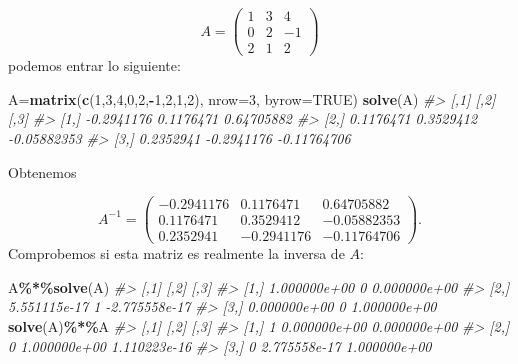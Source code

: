 \documentclass[
]{book}
\newenvironment{Shaded}{\begin{snugshade}}{\end{snugshade}}
\newcommand{\CommentTok}[1]{\textcolor[rgb]{0.56,0.35,0.01}{\textit{#1}}}
\newcommand{\DataTypeTok}[1]{\textcolor[rgb]{0.13,0.29,0.53}{#1}}
\newcommand{\DecValTok}[1]{\textcolor[rgb]{0.00,0.00,0.81}{#1}}
\newcommand{\KeywordTok}[1]{\textcolor[rgb]{0.13,0.29,0.53}{\textbf{#1}}}
\newcommand{\NormalTok}[1]{#1}
\newcommand{\OperatorTok}[1]{\textcolor[rgb]{0.81,0.36,0.00}{\textbf{#1}}}
\newcommand{\OtherTok}[1]{\textcolor[rgb]{0.56,0.35,0.01}{#1}}
\theoremstyle{definition}
\theoremstyle{definition}
\theoremstyle{definition}
\theoremstyle{remark}
\begin{document}
\[
A=\left(\begin{array}{ccc}
1 & 3 & 4 \\ 0 & 2 & -1 \\ 2 & 1 & 2\end{array}
\right)
\]
podemos entrar lo siguiente:

\begin{Shaded}
\begin{Highlighting}[]
\NormalTok{A=}\KeywordTok{matrix}\NormalTok{(}\KeywordTok{c}\NormalTok{(}\DecValTok{1}\NormalTok{,}\DecValTok{3}\NormalTok{,}\DecValTok{4}\NormalTok{,}\DecValTok{0}\NormalTok{,}\DecValTok{2}\NormalTok{,}\OperatorTok{{-}}\DecValTok{1}\NormalTok{,}\DecValTok{2}\NormalTok{,}\DecValTok{1}\NormalTok{,}\DecValTok{2}\NormalTok{), }\DataTypeTok{nrow=}\DecValTok{3}\NormalTok{, }\DataTypeTok{byrow=}\OtherTok{TRUE}\NormalTok{)}
\KeywordTok{solve}\NormalTok{(A) }
\CommentTok{\#\textgreater{}            [,1]       [,2]        [,3]}
\CommentTok{\#\textgreater{} [1,] {-}0.2941176  0.1176471  0.64705882}
\CommentTok{\#\textgreater{} [2,]  0.1176471  0.3529412 {-}0.05882353}
\CommentTok{\#\textgreater{} [3,]  0.2352941 {-}0.2941176 {-}0.11764706}
\end{Highlighting}
\end{Shaded}

Obtenemos

\[
A^{-1}=\left(\begin{array}{ccc}
-0.2941176 & 0.1176471 & 0.64705882\\
0.1176471 & 0.3529412 & -0.05882353\\
0.2352941 & -0.2941176 & -0.11764706
\end{array}
\right).
\]
Comprobemos si esta matriz es realmente la inversa de \(A\):

\begin{Shaded}
\begin{Highlighting}[]
\NormalTok{A}\OperatorTok{\%*\%}\KeywordTok{solve}\NormalTok{(A) }
\CommentTok{\#\textgreater{}              [,1] [,2]          [,3]}
\CommentTok{\#\textgreater{} [1,] 1.000000e+00    0  0.000000e+00}
\CommentTok{\#\textgreater{} [2,] 5.551115e{-}17    1 {-}2.775558e{-}17}
\CommentTok{\#\textgreater{} [3,] 0.000000e+00    0  1.000000e+00}
\KeywordTok{solve}\NormalTok{(A)}\OperatorTok{\%*\%}\NormalTok{A }
\CommentTok{\#\textgreater{}      [,1]         [,2]         [,3]}
\CommentTok{\#\textgreater{} [1,]    1 0.000000e+00 0.000000e+00}
\CommentTok{\#\textgreater{} [2,]    0 1.000000e+00 1.110223e{-}16}
\CommentTok{\#\textgreater{} [3,]    0 2.775558e{-}17 1.000000e+00}
\end{Highlighting}
\end{Shaded}
\end{document}
